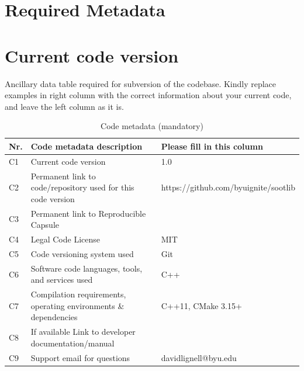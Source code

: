 \documentclass[preprint,letterpaper]{elsarticle}
\begin{document}

\section*{Required Metadata}

\section*{Current code version}

Ancillary data table required for subversion of the codebase. Kindly replace examples in right column with the correct information about your current code, and leave the left column as it is.

\begin{table}
\begin{tabular}{|l|p{6.5cm}|p{6.5cm}|}
\hline
\textbf{Nr.} & \textbf{Code metadata description} & \textbf{Please fill in this column} \\
\hline
C1 & Current code version & 1.0 \\
\hline
C2 & Permanent link to code/repository used for this code version & https://github.com/byuignite/sootlib \\
\hline
C3  & Permanent link to Reproducible Capsule & \\
\hline
C4 & Legal Code License & MIT \\
\hline
C5 & Code versioning system used & Git \\
\hline
C6 & Software code languages, tools, and services used & C++ \\
\hline
C7 & Compilation requirements, operating environments \& dependencies & C++11, CMake 3.15+\\
\hline
C8 & If available Link to developer documentation/manual &  \\
\hline
C9 & Support email for questions & davidlignell@byu.edu \\
\hline
\end{tabular}
\caption{Code metadata (mandatory)}
\end{table}
\end{document}
